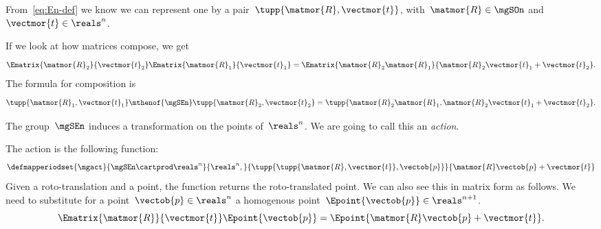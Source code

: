 From~\cref{eq:En-def} we know we can represent one by a pair~$\tupp{\matmor{R}, \vectmor{t}}$, with~$\matmor{R}\in\mgSOn$ and~$\vectmor{t} \in \reals^n$.

If we look at how matrices compose, we get
%
\begin{equation}
	\label{eq:SE-composition}
	\Ematrix{\matmor{R}_2}{\vectmor{t}_2} \Ematrix{\matmor{R}_1}{\vectmor{t}_1} = \Ematrix{\matmor{R}_2 \matmor{R}_1}{\matmor{R}_2\vectmor{t}_1 + \vectmor{t}_2}.
\end{equation}
%
The formula for composition is
%
\begin{equation}
	\label{eq:SE-composition-short}
	\tupp{\matmor{R}_1, \vectmor{t}_1} \mthenof{\mgSEn} \tupp{\matmor{R}_2, \vectmor{t}_2}  = \tupp{\matmor{R}_2 \matmor{R}_1, \matmor{R}_2 \vectmor{t}_1 + \vectmor{t}_2}.
\end{equation}
%

%

The group~$\mgSEn$ induces a transformation on the points of~$\reals^n$.
We are going to call this an \emph{action}.

The action is the following function:
%
\begin{equation}
	\label{eq:apply}
	\defmapperiodset{\mgact}{
		\mgSEn \cartprod \reals^n
	}{
		\reals^n,
	}{
		\tupp{ \tupp{\matmor{R}, \vectmor{t}}, \vectob{p}}
	}{
		\matmor{R}\vectob{p} + \vectmor{t}
	}
\end{equation}
Given a roto-translation and a point, the function returns the roto-translated point.
%
We can also see this in matrix form as follows.
We need to substitute for a point~$\vectob{p} \in \reals^n$ a homogenous point~$\Epoint{\vectob{p}} \in \reals^{n+1}$.
%
\begin{equation}
	\label{eq:homogenous}
	\Ematrix{\matmor{R}}{\vectmor{t}}
	\Epoint{\vectob{p}}
	=
	\Epoint{\matmor{R}\vectob{p} + \vectmor{t}}.
\end{equation}
%

